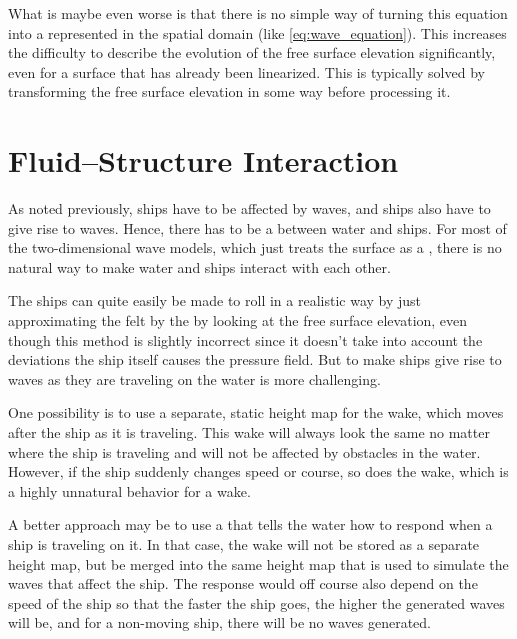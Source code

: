 What is maybe even worse is that there is no simple way of turning this equation into a \PDE represented in the spatial domain (like \eqref{eq:wave_equation}). This increases the difficulty to describe the evolution of the free surface elevation significantly, even for a surface that has already been linearized. This is typically solved by transforming the free surface elevation in some way before processing it.

\section{Fluid--Structure Interaction}

As noted previously, ships have to be affected by waves, and ships also have to give rise to waves. Hence, there has to be a  between water and ships. For most of the two-dimensional wave models, which just treats the surface as a , there is no natural way to make water and ships interact with each other.

The ships can quite easily be made to roll in a realistic way by just approximating the  felt by the  by looking at the free surface elevation, even though this method is slightly incorrect since it doesn't take into account the deviations the ship itself causes the pressure field. But to make ships give rise to waves as they are traveling on the water is more challenging.

One possibility is to use a separate, static height map for the wake, which moves after the ship as it is traveling. This wake will always look the same no matter where the ship is traveling and will not be affected by obstacles in the water. However, if the ship suddenly changes speed or course, so does the wake, which is a highly unnatural behavior for a wake.

A better approach may be to use a  that tells the water how to respond when a ship is traveling on it. In that case, the wake will not be stored as a separate height map, but be merged into the same height map that is used to simulate the waves that affect the ship. The response would off course also depend on the speed of the ship so that the faster the ship goes, the higher the generated waves will be, and for a non-moving ship, there will be no waves generated.